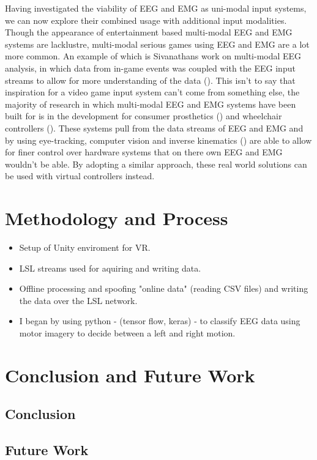 \documentclass[11pt, a4paper]{article}
\newcommand{\citethis}[1]{(\cite{#1})}
\begin{document}
\hfill
  
Having investigated the viability of EEG and EMG as uni-modal input systems, we can now explore their combined usage with additional input modalities. Though the appearance of entertainment based multi-modal EEG and EMG systems are lacklustre, multi-modal serious games using EEG and EMG are a lot more common. An example of which is Sivanathans work on multi-modal EEG analysis, in which data from in-game events was coupled with the EEG input streams to allow for more understanding of the data \citethis{sivanathan2014temporal}. This isn't to say that inspiration for a video game input system can't come from something else, the majority of research in which multi-modal EEG and EMG systems have been built for is in the development for consumer prosthetics \citethis{shi2019novel} and wheelchair controllers \citethis{carlson2013brain}. These systems pull from the data streams of EEG and EMG and by using eye-tracking, computer vision and inverse kinematics \citethis{mcmullen2013demonstration} are able to allow for finer control over hardware systems that on there own EEG and EMG wouldn't be able. By adopting a similar approach, these real world solutions can be used with virtual controllers instead. 


\pagebreak
\section{Methodology and Process}			%

\begin{itemize}
  \item Setup of Unity enviroment for VR.
  \item LSL streams used for aquiring and writing data.
  \item Offline processing and spoofing "online data" (reading CSV files) and writing the data over the LSL network.
  \item I began by using python - (tensor flow, keras) - to classify EEG data using motor imagery to decide between a left and right motion.
\end{itemize}

\hfill




\pagebreak
\section{Conclusion and Future Work}

\subsection{Conclusion}

\subsection{Future Work}			%




\pagebreak
\printbibliography
\printbibliography[keyword = {tree}]
\end{document}

